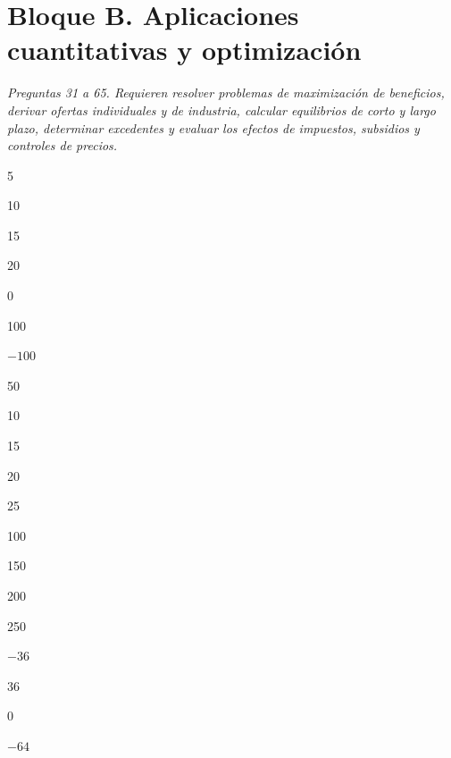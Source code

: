 \section*{Bloque B. Aplicaciones cuantitativas y optimización}

\noindent\textit{Preguntas 31 a 65. Requieren resolver problemas de maximización de beneficios, derivar ofertas individuales y de industria, calcular equilibrios de corto y largo plazo, determinar excedentes y evaluar los efectos de impuestos, subsidios y controles de precios.}

\begin{opts}
    \item 5
    \item 10
    \item 15
    \item 20
\end{opts}

\begin{opts}
    \item 0
    \item 100
    \item $-100$
    \item 50
\end{opts}

\begin{opts}
    \item 10
    \item 15
    \item 20
    \item 25
\end{opts}

\begin{opts}
    \item 100
    \item 150
    \item 200
    \item 250
\end{opts}

\begin{opts}
    \item $-36$
    \item 36
    \item 0
    \item $-64$
\end{opts}

